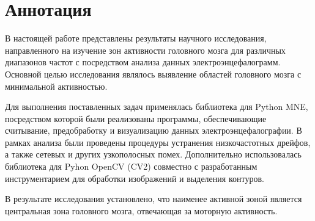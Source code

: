 \chapter*{Аннотация}
\label{ch:intro}
В настоящей работе представлены результаты научного исследования, направленного на изучение зон активности головного мозга для различных диапазонов частот с посредством анализа данных электроэнцефалограмм. Основной целью исследования являлось выявление областей головного мозга с минимальной активностью.

Для выполнения поставленных задач применялась библиотека для Python MNE, посредством которой были реализованы программы, обеспечивающие считывание, предобработку и визуализацию данных электроэнцефалографии. В рамках анализа были проведены процедуры устранения низкочастотных дрейфов, а также сетевых и других узкополосных помех. Дополнительно использовалась библиотека для Pyhon OpenCV (CV2) совместно с разработанным инструментарием для обработки изображений и выделения контуров.

В результате исследования установлено, что наименее активной зоной является центральная зона головного мозга, отвечающая за моторную активность.
\vspace*{-\baselineskip}
